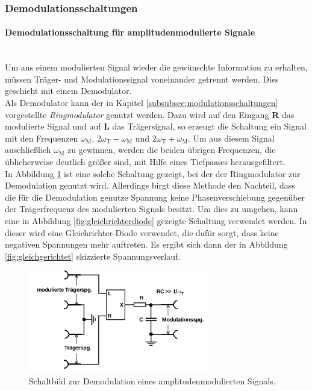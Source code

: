 \subsubsection{Demodulationsschaltungen}
\label{subsubsec:demodulationschaltungen}
\paragraph{Demodulationsschaltung für amplitudenmodulierte Signale}
\mbox{}\\
Um aus einem modulierten Signal wieder die gewünschte Information zu erhalten,
müssen Träger- und Modulationssignal voneinander getrennt werden.
Dies geschieht mit einem Demodulator.\\
Als Demodulator kann der in Kapitel \ref{subsubsec:modulationsschaltungen}
vorgestellte \textit{Ringmodulator} genutzt werden.
Dazu wird auf den Eingang \textbf{R} das modulierte Signal und
auf \textbf{L} das Trägersignal, so erzeugt die Schaltung
ein Signal mit den Frequenzen
$\omega_{\text{M}}$, $2\omega_{\text{T}} - \omega_{\text{M}}$
und $2\omega_{\text{T}} + \omega_{\text{M}}$.
Um aus diesem Signal auschließlich $\omega_{\text{M}}$ zu gewinnen,
werden die beiden übrigen Frequenzen, die üblicherweise deutlich größer sind,
mit Hilfe eines Tiefpasses herausgefiltert.\\
In Abbildung \ref{fig:demodulatorschaltung} ist eine solche Schaltung gezeigt,
bei der der Ringmodulator zur Demodulation genutzt wird. Allerdings
birgt diese Methode den Nachteil, dass die für die Demodulation genutze
Spannung keine Phasenverschiebung gegenüber der Trägerfrequenz des
modulierten Signals besitzt.
Um dies zu umgehen, kann eine in Abbildung \ref{fig:gleichrichterdiode} gezeigte
Schaltung verwendet werden. In dieser wird eine Gleichrichter-Diode verwendet,
die dafür sorgt, dass keine negativen Spannungen mehr auftreten.
Es ergibt sich dann der in Abbildung \ref{fig:gleichgerichtet}
skizzierte Spannungsverlauf.




\begin{figure}
\centering
\includegraphics[width=0.7\textwidth]{figures/demodulator.PNG}
\caption{Schaltbild zur Demodulation eines amplitudenmodulierten Signals.\cite{sample}}
\label{fig:demodulatorschaltung}
\end{figure}

